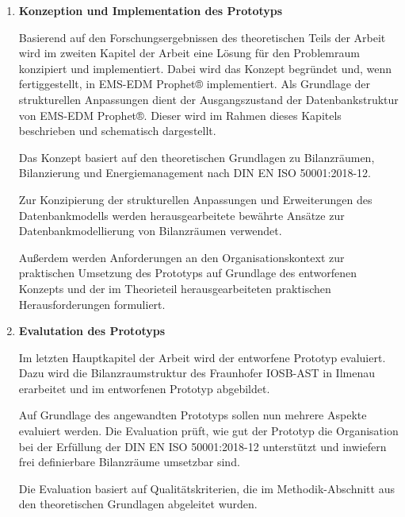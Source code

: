 \begin{enumerate}
    \item \textbf{Konzeption und Implementation des Prototyps}

    Basierend auf den Forschungsergebnissen des theoretischen Teils der Arbeit wird im zweiten Kapitel der Arbeit eine Lösung für den Problemraum
    konzipiert und implementiert.
    Dabei wird das Konzept begründet und, wenn fertiggestellt, in EMS-EDM Prophet® implementiert.
    Als Grundlage der strukturellen Anpassungen dient der Ausgangszustand der Datenbankstruktur von EMS-EDM Prophet®.
    Dieser wird im Rahmen dieses Kapitels beschrieben und schematisch dargestellt.
    
    Das Konzept basiert auf den theoretischen Grundlagen zu Bilanzräumen, Bilanzierung und Energiemanagement nach DIN EN ISO 50001:2018-12.
    
    Zur Konzipierung der strukturellen Anpassungen und Erweiterungen des Datenbankmodells werden herausgearbeitete bewährte Ansätze zur Datenbankmodellierung von
    Bilanzräumen verwendet.
    
    Außerdem werden Anforderungen an den Organisationskontext zur praktischen Umsetzung des Prototyps auf Grundlage des entworfenen Konzepts und der
    im Theorieteil herausgearbeiteten praktischen Herausforderungen formuliert.

    
    \item \textbf{Evalutation des Prototyps}
    
    Im letzten Hauptkapitel der Arbeit wird der entworfene Prototyp evaluiert.
    Dazu wird die Bilanzraumstruktur des Fraunhofer IOSB-AST in Ilmenau erarbeitet und im entworfenen Prototyp abgebildet.

    Auf Grundlage des angewandten Prototyps sollen nun mehrere Aspekte evaluiert werden.
    Die Evaluation prüft, wie gut der Prototyp die Organisation bei der Erfüllung der DIN EN ISO 50001:2018-12 unterstützt und 
    inwiefern frei definierbare Bilanzräume umsetzbar sind.

    Die Evaluation basiert auf Qualitätskriterien, die im Methodik-Abschnitt aus den theoretischen Grundlagen abgeleitet wurden.
\end{enumerate}